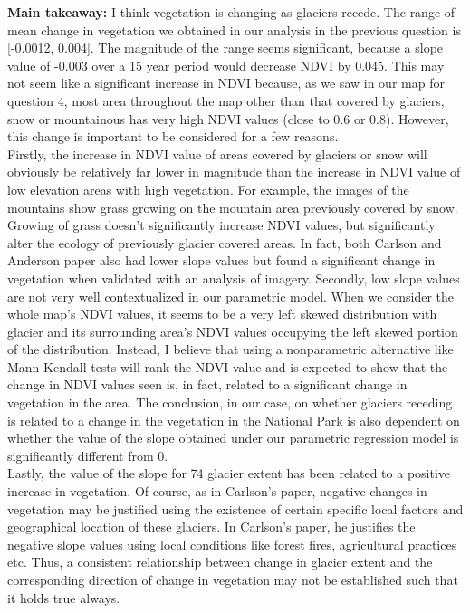 \documentclass[11pt]{article}
\begin{document}
\textbf{Main takeaway:} I think vegetation is changing as glaciers recede. The range of mean change in
vegetation we obtained in our analysis in the previous question is [-0.0012, 0.004]. The
magnitude of the range seems significant, because a slope value of -0.003 over a 15 year
period would decrease NDVI by 0.045. This may not seem like a significant increase in NDVI
because, as we saw in our map for question 4, most area throughout the map other than that
covered by glaciers, snow or mountainous has very high NDVI values (close to 0.6 or 0.8).
However, this change is important to be considered for a few reasons.\\

Firstly, the increase in NDVI value of areas covered by glaciers or snow will obviously be
relatively far lower in magnitude than the increase in NDVI value of low elevation areas with
high vegetation. For example, the images of the mountains show grass growing on the
mountain area previously covered by snow. Growing of grass doesn’t significantly increase
NDVI values, but significantly alter the ecology of previously glacier covered areas. In fact, both Carlson and Anderson paper also had lower slope values but found a significant change in
vegetation when validated with an analysis of imagery. Secondly, low slope values are not very
well contextualized in our parametric model. When we consider the whole map’s NDVI values, it
seems to be a very left skewed distribution with glacier and its surrounding area’s NDVI values
occupying the left skewed portion of the distribution. Instead, I believe that using a
nonparametric alternative like Mann-Kendall tests will rank the NDVI value and is expected to
show that the change in NDVI values seen is, in fact, related to a significant change in
vegetation in the area. The conclusion, in our case, on whether glaciers receding is related to a
change in the vegetation in the National Park is also dependent on whether the value of the
slope obtained under our parametric regression model is significantly different from 0.\\

Lastly, the value of the slope for 74%
glacier extent has been related to a positive increase in vegetation. Of course, as in Carlson’s
paper, negative changes in vegetation may be justified using the existence of certain specific
local factors and geographical location of these glaciers. In Carlson’s paper, he justifies the
negative slope values using local conditions like forest fires, agricultural practices etc. Thus, a
consistent relationship between change in glacier extent and the corresponding direction of
change in vegetation may not be established such that it holds true always.\\
\end{document}
